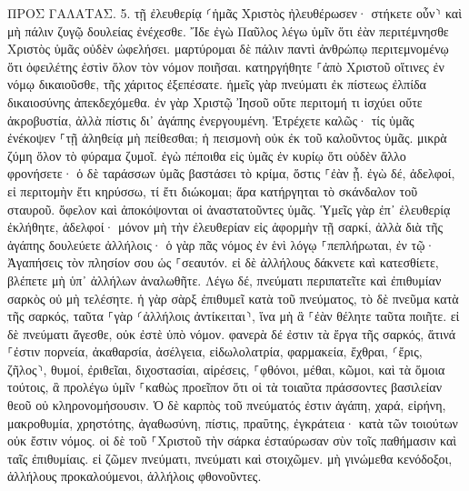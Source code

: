 \documentclass[twoside, 9pt]{extreport}
\begin{document}
ΠΡΟΣ ΓΑΛΑΤΑΣ.
5.
τῇ ἐλευθερίᾳ ⸂ἡμᾶς Χριστὸς ἠλευθέρωσεν· στήκετε οὖν⸃ καὶ μὴ πάλιν ζυγῷ δουλείας ἐνέχεσθε. 
Ἴδε ἐγὼ Παῦλος λέγω ὑμῖν ὅτι ἐὰν περιτέμνησθε Χριστὸς ὑμᾶς οὐδὲν ὠφελήσει. 
μαρτύρομαι δὲ πάλιν παντὶ ἀνθρώπῳ περιτεμνομένῳ ὅτι ὀφειλέτης ἐστὶν ὅλον τὸν νόμον ποιῆσαι. 
κατηργήθητε ⸀ἀπὸ Χριστοῦ οἵτινες ἐν νόμῳ δικαιοῦσθε, τῆς χάριτος ἐξεπέσατε. 
ἡμεῖς γὰρ πνεύματι ἐκ πίστεως ἐλπίδα δικαιοσύνης ἀπεκδεχόμεθα. 
ἐν γὰρ Χριστῷ Ἰησοῦ οὔτε περιτομή τι ἰσχύει οὔτε ἀκροβυστία, ἀλλὰ πίστις δι᾽ ἀγάπης ἐνεργουμένη. 
Ἐτρέχετε καλῶς· τίς ὑμᾶς ἐνέκοψεν ⸀τῇ ἀληθείᾳ μὴ πείθεσθαι; 
ἡ πεισμονὴ οὐκ ἐκ τοῦ καλοῦντος ὑμᾶς. 
μικρὰ ζύμη ὅλον τὸ φύραμα ζυμοῖ. 
ἐγὼ πέποιθα εἰς ὑμᾶς ἐν κυρίῳ ὅτι οὐδὲν ἄλλο φρονήσετε· ὁ δὲ ταράσσων ὑμᾶς βαστάσει τὸ κρίμα, ὅστις ⸀ἐὰν ᾖ. 
ἐγὼ δέ, ἀδελφοί, εἰ περιτομὴν ἔτι κηρύσσω, τί ἔτι διώκομαι; ἄρα κατήργηται τὸ σκάνδαλον τοῦ σταυροῦ. 
ὄφελον καὶ ἀποκόψονται οἱ ἀναστατοῦντες ὑμᾶς. 
Ὑμεῖς γὰρ ἐπ᾽ ἐλευθερίᾳ ἐκλήθητε, ἀδελφοί· μόνον μὴ τὴν ἐλευθερίαν εἰς ἀφορμὴν τῇ σαρκί, ἀλλὰ διὰ τῆς ἀγάπης δουλεύετε ἀλλήλοις· 
ὁ γὰρ πᾶς νόμος ἐν ἑνὶ λόγῳ ⸀πεπλήρωται, ἐν τῷ· Ἀγαπήσεις τὸν πλησίον σου ὡς ⸀σεαυτόν. 
εἰ δὲ ἀλλήλους δάκνετε καὶ κατεσθίετε, βλέπετε μὴ ὑπ᾽ ἀλλήλων ἀναλωθῆτε. 
Λέγω δέ, πνεύματι περιπατεῖτε καὶ ἐπιθυμίαν σαρκὸς οὐ μὴ τελέσητε. 
ἡ γὰρ σὰρξ ἐπιθυμεῖ κατὰ τοῦ πνεύματος, τὸ δὲ πνεῦμα κατὰ τῆς σαρκός, ταῦτα ⸀γὰρ ⸂ἀλλήλοις ἀντίκειται⸃, ἵνα μὴ ἃ ⸀ἐὰν θέλητε ταῦτα ποιῆτε. 
εἰ δὲ πνεύματι ἄγεσθε, οὐκ ἐστὲ ὑπὸ νόμον. 
φανερὰ δέ ἐστιν τὰ ἔργα τῆς σαρκός, ἅτινά ⸀ἐστιν πορνεία, ἀκαθαρσία, ἀσέλγεια, 
εἰδωλολατρία, φαρμακεία, ἔχθραι, ⸂ἔρις, ζῆλος⸃, θυμοί, ἐριθεῖαι, διχοστασίαι, αἱρέσεις, 
⸀φθόνοι, μέθαι, κῶμοι, καὶ τὰ ὅμοια τούτοις, ἃ προλέγω ὑμῖν ⸀καθὼς προεῖπον ὅτι οἱ τὰ τοιαῦτα πράσσοντες βασιλείαν θεοῦ οὐ κληρονομήσουσιν. 
Ὁ δὲ καρπὸς τοῦ πνεύματός ἐστιν ἀγάπη, χαρά, εἰρήνη, μακροθυμία, χρηστότης, ἀγαθωσύνη, πίστις, 
πραΰτης, ἐγκράτεια· κατὰ τῶν τοιούτων οὐκ ἔστιν νόμος. 
οἱ δὲ τοῦ ⸀Χριστοῦ τὴν σάρκα ἐσταύρωσαν σὺν τοῖς παθήμασιν καὶ ταῖς ἐπιθυμίαις. 
εἰ ζῶμεν πνεύματι, πνεύματι καὶ στοιχῶμεν. 
μὴ γινώμεθα κενόδοξοι, ἀλλήλους προκαλούμενοι, ἀλλήλοις φθονοῦντες. 
\end{document}
